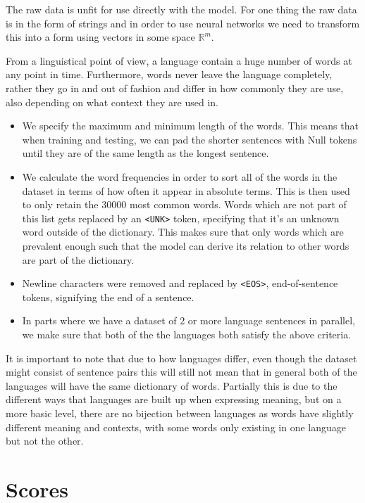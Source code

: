 The raw data is unfit for use directly with the model. For one thing the raw
data is in the form of strings and in order to use neural networks we need to
transform this into a form using vectors in some space $\mathbb{R}^m$.

From a linguistical point of view, a language contain a huge number of words at
any point in time. Furthermore, words never leave the language completely,
rather they go in and out of fashion and differ in how commonly they are use,
also depending on what context they are used in.

\begin{itemize}
\item We specify the maximum and minimum length of the words. This means that
  when training and testing, we can pad the shorter sentences with Null tokens
  until they are of the same length as the longest sentence.
\item We calculate the word frequencies in order to sort all of the words in the
  dataset in terms of how often it appear in absolute terms. This is then used
  to only retain the 30000 most common words. Words which are not part of this
  list gets replaced by an \texttt{<UNK>} token, specifying that it's an unknown
  word outside of the dictionary. This makes sure that only words which are
  prevalent enough such that the model can derive its relation to other words
  are part of the dictionary.
\item Newline characters were removed and replaced by \texttt{<EOS>},
  end-of-sentence tokens, signifying the end of a sentence.
\item In parts where we have a dataset of 2 or more language sentences in
  parallel, we make sure that both of the the languages both satisfy the above criteria.
\end{itemize}

It is important to note that due to how languages differ, even though the
dataset might consist of sentence pairs this will still not mean that in general
both of the languages will have the same dictionary of words. Partially this is
due to the different ways that languages are built up when expressing meaning,
but on a more basic level, there are no bijection between languages as words
have slightly different meaning and contexts, with some words only existing in
one language but not the other.

\section{Scores}

